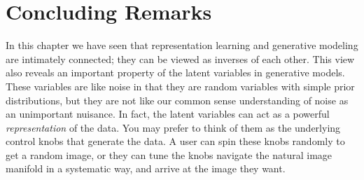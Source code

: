 


\section{Concluding Remarks}

In this chapter we have seen that representation learning and generative modeling are intimately connected; they can be viewed as inverses of each other. This view also reveals an important property of the latent variables in generative models. These variables are like noise in that they are random variables with simple prior distributions, but they are not like our common sense understanding of noise as an unimportant nuisance. In fact, the latent variables can act as a powerful \textit{representation} of the data. You may prefer to think of them as the underlying control knobs that generate the data. A user can spin these knobs randomly to get a random image, or they can tune the knobs navigate the natural image manifold in a systematic way, and arrive at the image they want.